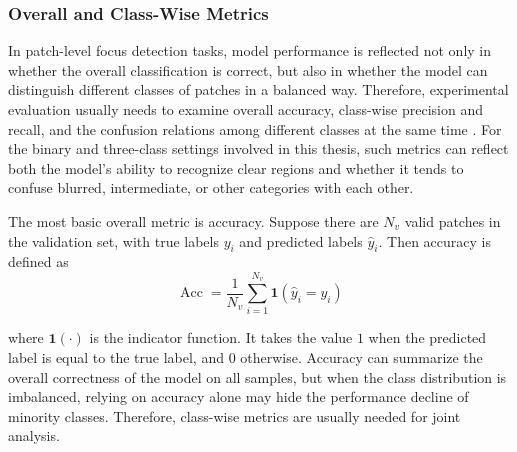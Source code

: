 \subsubsection{Overall and Class-Wise Metrics}
\par In patch-level focus detection tasks, model performance is reflected not
only in whether the overall classification is correct, but also in whether the
model can distinguish different classes of patches in a balanced way. Therefore,
experimental evaluation usually needs to examine overall accuracy, class-wise
precision and recall, and the confusion relations among different classes at the
same time \cite[pp.~151--160,~256--280]{schutze2008introduction}. For the binary
and three-class settings involved in this thesis, such metrics can reflect both
the model's ability to recognize clear regions and whether it tends to confuse
blurred, intermediate, or other categories with each other.

\par The most basic overall metric is accuracy. Suppose there are $N_v$ valid
patches in the validation set, with true labels $y_i$ and predicted labels
$\hat{y}_i$. Then accuracy is defined as
\begin{equation}
    \operatorname{Acc}=\frac{1}{N_v}\sum_{i=1}^{N_v}\mathbf{1}(\hat{y}_i=y_i)
    \label{eq:accuracy-basic}
\end{equation}
\par where $\mathbf{1}(\cdot)$ is the indicator function. It takes the value $1$
when the predicted label is equal to the true label, and $0$ otherwise. Accuracy
can summarize the overall correctness of the model on all samples, but when the
class distribution is imbalanced, relying on accuracy alone may hide the
performance decline of minority classes. Therefore, class-wise metrics are
usually needed for joint analysis.

